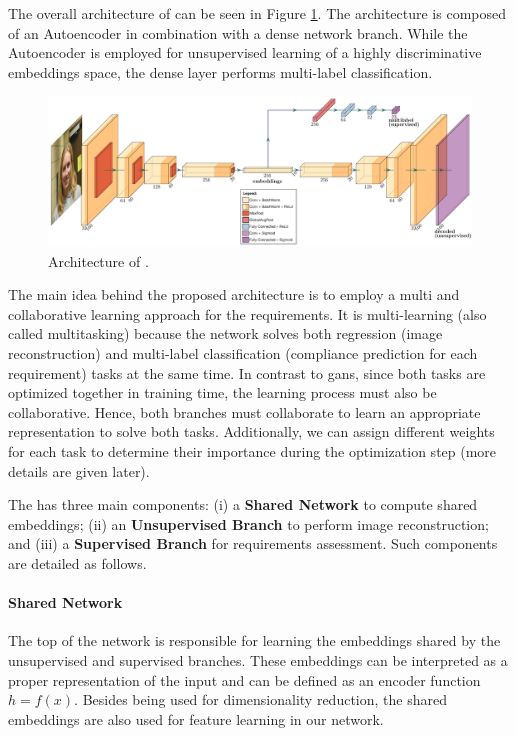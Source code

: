 The overall architecture of \methodname can be seen in Figure \ref{fig:icaonet}. The architecture is composed of an Autoencoder in combination with a dense network branch. While the Autoencoder is employed for unsupervised learning of a highly discriminative embeddings space, the dense layer performs multi-label classification. 

\begin{figure}
    \centering
    \includegraphics[width=\linewidth]{images/icaonet.pdf}
    \caption{Architecture of \methodname.}
    \label{fig:icaonet}
\end{figure}

The main idea behind the proposed architecture is to employ a multi and collaborative learning approach for the \icao requirements. It is multi-learning (also called multitasking) because the network solves both regression (image reconstruction) and multi-label classification (compliance prediction for each requirement) tasks at the same time. In contrast to \acfp{gan}, since both tasks are optimized together in training time, the learning process must also be collaborative. Hence, both branches must collaborate to learn an appropriate representation to solve both tasks. Additionally, we can assign different weights for each task to determine their importance during the optimization step (more details are given later).

The \methodname has three main components: (i) a \textbf{Shared Network} to compute shared embeddings; (ii) an \textbf{Unsupervised Branch} to perform image reconstruction; and (iii) a \textbf{Supervised Branch} for requirements assessment. Such components are detailed as follows.

\paragraph{Shared Network}

The top of the network is responsible for learning the embeddings shared by the unsupervised and supervised branches. These embeddings can be interpreted as a proper representation of the input and can be defined as an encoder function $h = f(x)$. Besides being used for dimensionality reduction, the shared embeddings are also used for feature learning in our network.

